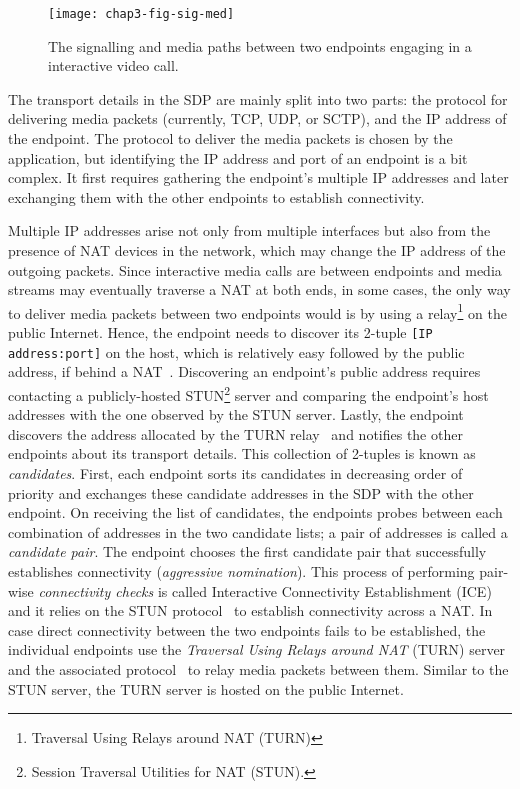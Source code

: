 \begin{figure}[!t]
\centerline{\texttt{[image: chap3-fig-sig-med]}}
\caption{The signalling and media paths between two endpoints engaging in
a interactive video call.}
\label{fig:3:sig.media}
\end{figure}


The transport details in the SDP are mainly split into two parts: the protocol
for delivering media packets (currently, TCP, UDP, or SCTP), and the 
IP address of the endpoint. The protocol to deliver the media packets is
chosen by the application, but identifying the IP address and port of an
endpoint is a bit complex. It first requires gathering the endpoint's multiple
IP addresses and later exchanging them with the other endpoints to establish
connectivity.

Multiple IP addresses arise not only from multiple interfaces but also from
the presence of NAT devices in the network, which may change the IP address of
the outgoing packets. Since interactive media calls are between endpoints and
media streams may eventually traverse a NAT at both ends, in some cases, the
only way to deliver media packets between two endpoints would is by using
a relay\footnote{Traversal Using Relays around NAT (TURN)} on the public
Internet. Hence, the endpoint needs to discover its 2-tuple \texttt{[IP
address:port]} on the host, which is relatively easy followed by the public 
address, if behind a NAT~\cite{rfc5389}. Discovering an endpoint's public address
requires contacting a publicly-hosted STUN\footnote{Session Traversal
Utilities for NAT (STUN).} server and comparing the endpoint's
host addresses with the one observed by the STUN server. Lastly, the endpoint
discovers the address allocated by the TURN relay~\cite{rfc5766} and notifies
the other endpoints about its transport details. This collection of 2-tuples
is known as \emph{candidates}. First, each endpoint sorts its candidates
in decreasing order of priority and exchanges these candidate addresses in the
SDP with the other endpoint. On receiving the list of candidates, the endpoints
probes between each combination of addresses in the two candidate
lists; a pair of addresses is called a \emph{candidate pair}. The endpoint
chooses the first candidate pair that successfully establishes connectivity
(\emph{aggressive nomination}). This process of performing pair-wise
\emph{connectivity checks} is called Interactive Connectivity Establishment
(ICE)~\cite{rfc5245, rfc6544} and it relies on the STUN protocol~\cite{rfc5389} to establish connectivity
across a NAT. In case direct connectivity between the two endpoints fails 
to be established, the individual endpoints use the \emph{Traversal Using Relays
around NAT} (TURN) server and the associated protocol~\cite{rfc5766} to relay
media packets between them. Similar to the STUN server, the TURN
server is hosted on the public Internet.


